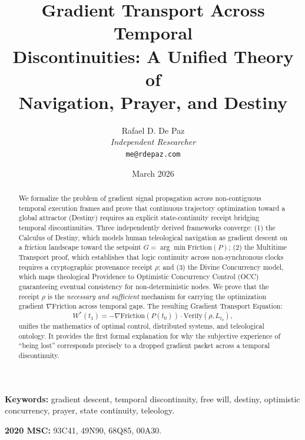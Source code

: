 \documentclass[12pt, a4paper]{article}
\theoremstyle{plain}
\theoremstyle{definition}
\theoremstyle{remark}
\begin{document}
\title{
  \textbf{Gradient Transport Across Temporal \\
  Discontinuities: A Unified Theory of \\
  Navigation, Prayer, and Destiny}
}
\author{
  Rafael D. De Paz \\
  \textit{Independent Researcher} \\
  \texttt{me@rdepaz.com}
}
\date{March 2026}
\maketitle

\begin{abstract}
We formalize the problem of gradient signal propagation across non-contiguous temporal execution frames and prove that continuous trajectory optimization toward a global attractor (Destiny) requires an explicit state-continuity receipt bridging temporal discontinuities. Three independently derived frameworks converge: (1) the Calculus of Destiny, which models human teleological navigation as gradient descent on a friction landscape toward the setpoint $G = \arg\min \text{Friction}(P)$; (2) the Multitime Transport proof, which establishes that logic continuity across non-synchronous clocks requires a cryptographic provenance receipt $\rho$; and (3) the Divine Concurrency model, which maps theological Providence to Optimistic Concurrency Control (OCC) guaranteeing eventual consistency for non-deterministic nodes. We prove that the receipt $\rho$ is the \emph{necessary and sufficient} mechanism for carrying the optimization gradient $\nabla \text{Friction}$ across temporal gaps. The resulting Gradient Transport Equation:
\begin{equation*}
    W^*(t_1) = -\nabla \text{Friction}(P(t_0)) \cdot \text{Verify}(\rho, L_{t_0}),
\end{equation*}
unifies the mathematics of optimal control, distributed systems, and teleological ontology. It provides the first formal explanation for why the subjective experience of ``being lost'' corresponds precisely to a dropped gradient packet across a temporal discontinuity.
\end{abstract}

\vspace{1em}
\noindent\textbf{Keywords:} gradient descent, temporal discontinuity, free will, destiny, optimistic concurrency, prayer, state continuity, teleology.

\vspace{0.5em}
\noindent\textbf{2020 MSC:} 93C41, 49N90, 68Q85, 00A30.
\end{document}
